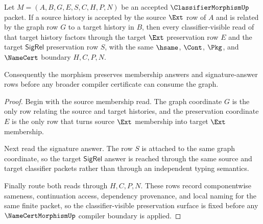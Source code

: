 \begin{theorem}
\label{thm:classifiermorphism-ext-sigrel-preservation}
Let $M=(A,B,G,E,S,C,H,P,N)$ be an accepted $\ClassifierMorphismUp$ packet. If a source history is accepted by the source $\Ext$ row of $A$ and is related by the graph row $G$ to a target history in $B$, then every classifier-visible read of that target history factors through the target $\Ext$ preservation row $E$ and the target $\mathsf{SigRel}$ preservation row $S$, with the same $\hsame$, $\Cont$, $\Pkg$, and $\NameCert$ boundary $H,C,P,N$.

Consequently the morphism preserves membership answers and signature-answer rows before any broader compiler certificate can consume the graph.
\end{theorem}
\begin{proof}
Begin with the source membership read. The graph coordinate $G$ is the only row relating the source and target histories, and the preservation coordinate $E$ is the only row that turns source $\Ext$ membership into target $\Ext$ membership.

Next read the signature answer. The row $S$ is attached to the same graph coordinate, so the target $\mathsf{SigRel}$ answer is reached through the same source and target classifier packets rather than through an independent typing semantics.

Finally route both reads through $H,C,P,N$. These rows record componentwise sameness, continuation access, dependency provenance, and local naming for the same finite packet, so the classifier-visible preservation surface is fixed before any $\NameCertMorphismUp$ compiler boundary is applied.
\end{proof}

